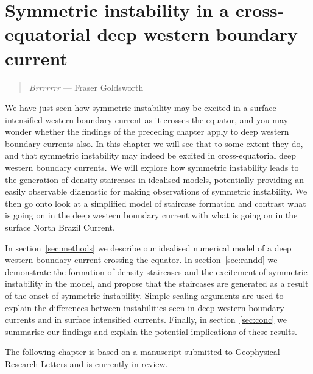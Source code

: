 \chapter{Symmetric instability in a cross-equatorial deep western boundary current}
\label{chap:4}
\begin{quote}
    \textit{Brrrrrrr} --- Fraser Goldsworth
\end{quote}

We have just seen how symmetric instability may be excited in a surface intensified western boundary current as it crosses the equator, and you may wonder whether the findings of the preceding chapter apply to deep western boundary currents also. In this chapter we will see that to some extent they do, and that symmetric instability may indeed be excited in cross-equatorial deep western boundary currents. We will explore how symmetric instability leads to the generation of density staircases in idealised models, potentially providing an easily observable diagnostic for making observations of symmetric instability. We then go onto look at a simplified model of staircase formation and contrast what is going on in the deep western boundary current with what is going on in the surface North Brazil Current.

In section~\ref{sec:methods} we describe our idealised numerical model of a deep western boundary current crossing the equator. In section~\ref{sec:randd} we demonstrate the formation of density staircases and the excitement of symmetric instability in the model, and propose that the staircases are generated as a result of the onset of symmetric instability. Simple scaling arguments are used to explain the differences between instabilities seen in deep western boundary currents and in surface intensified currents. Finally, in section~\ref{sec:conc} we summarise our findings and explain the potential implications of these results.

The following chapter is based on a manuscript submitted to Geophysical Research Letters and is currently in review.

